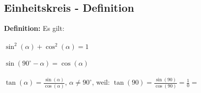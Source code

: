 \documentclass{standalone}
\begin{document}
\subsection{Einheitskreis - Definition}
\textbf{Definition:} Es gilt:
\paragraph{}
$\sin^2(\alpha) + \cos^2(\alpha) = 1$
\paragraph{}
$\sin(90^\circ - \alpha) = \cos(\alpha)$
\paragraph{}
$\tan(\alpha) = \frac{\sin(\alpha)}{\cos(\alpha)}$, $\alpha \neq 90^\circ$, weil:
$\tan(90)=\frac{\sin(90)}{\cos(90)} = \frac{1}{0} = $ \Lightning
\end{document}
